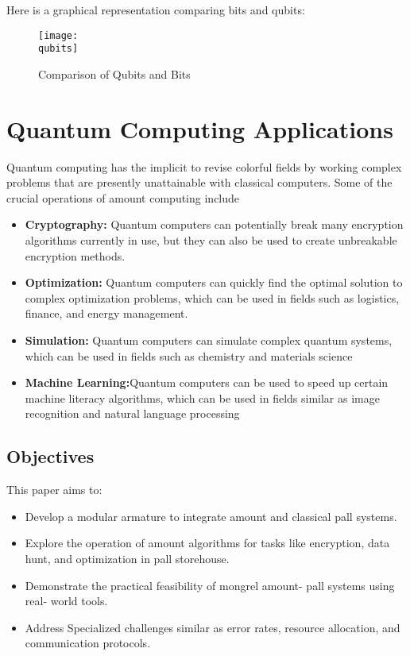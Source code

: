 \documentclass[12pt,a4paper]{article}
\newcommand{\qubits}{D:/SEM-5/FSDC/quantum-cloud-integration/images/qubits_vs_bits.png}
\begin{document}
Here is a graphical representation comparing bits and qubits:

\begin{figure}[h!]
    \centering
    \texttt{[image: \\qubits]}
    \caption{Comparison of Qubits and Bits}
    \label{fig:qubits_vs_bits}
\end{figure}

\newpage

\begin{center}
    \fontsize{14}{16}\selectfont \bfseries
    \section{Quantum Computing Applications}
\end{center}
    
Quantum computing has the implicit to revise  colorful fields by  working complex problems that are  presently  unattainable 
 with classical computers. Some of the  crucial  operations of amount computing include 

\begin{itemize}
\item \textbf{Cryptography:} Quantum computers can potentially break many encryption algorithms currently in
use, but they can also be used to create unbreakable encryption methods.
\item \textbf{Optimization:} Quantum computers can quickly find the optimal solution to complex
optimization problems, which can be used in fields such as logistics, finance, and energy management.
\item \textbf{Simulation:} Quantum computers can simulate complex quantum systems, which can be used in
fields such as chemistry and materials science
\item \textbf{Machine Learning:}Quantum computers can be used to speed up certain machine
literacy algorithms, which can be used in fields similar as image recognition and natural language processing
\end{itemize}


\subsection{Objectives}
This paper aims to:
\begin{itemize}
   \item  Develop a modular armature to integrate amount and classical  pall systems. 
   \item Explore the operation of amount algorithms for tasks like encryption, data hunt, and optimization in pall storehouse.
   \item  Demonstrate the practical feasibility of  mongrel amount-  pall systems using real- world tools. 
   \item  Address Specialized challenges similar as error rates, resource allocation, and communication protocols. 

\end{itemize}
\end{document}
